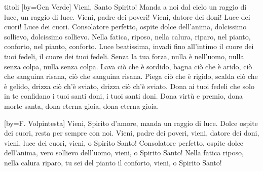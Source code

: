 \begin{songs}{titoli}
[by={Gen Verde}]
\beginchorus
Vieni, Santo Spirito! Manda a noi dal cielo
un raggio di luce, un raggio di luce.
Vieni, padre dei poveri! Vieni, datore dei doni!
Luce dei cuori! Luce dei cuori.
\endchorus
\beginverse
Consolatore perfetto, ospite dolce dell'anima,
dolcissimo sollievo, dolcissimo sollievo.
Nella fatica, riposo, nella calura, riparo,
nel pianto, conforto, nel pianto, conforto.
\endverse
\beginverse
Luce beatissima, invadi fino all'intimo
il cuore dei tuoi fedeli, il cuore dei tuoi fedeli.
Senza la tua forza, nulla è nell'uomo,
nulla senza colpa, nulla senza colpa.
\endverse
\beginverse
Lava ciò che è sordido, bagna ciò che è arido,
ciò che sanguina risana, ciò che sanguina risana.
Piega ciò che è rigido, scalda ciò che è gelido,
drizza ciò ch'è sviato, drizza ciò ch'è sviato.
\endverse
\beginverse
Dona ai tuoi fedeli che solo in te confidano
i tuoi santi doni, i tuoi santi doni.
Dona virtù e premio, dona morte santa,
dona eterna gioia, dona eterna gioia.
\endverse
\endsong

[by={F. Volpintesta}]
\beginchorus
Vieni, Spirito d'amore,
manda un raggio di luce.
Dolce ospite dei cuori,
resta per sempre con noi.
\endchorus
\beginverse
Vieni, padre dei poveri,
vieni, datore dei doni,
vieni, luce dei cuori,
vieni, o Spirito Santo!
\endverse
\beginverse
Consolatore perfetto,
ospite dolce dell'anima,
vero sollievo dell'uomo,
vieni, o Spirito Santo!
\endverse
\beginverse
Nella fatica riposo,
nella calura riparo,
tu sei del pianto il conforto,
vieni, o Spirito Santo!
\endverse
\endsong

\end{songs}
